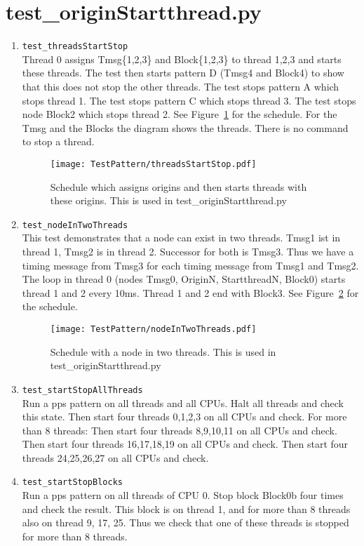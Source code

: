 \documentclass[12pt,a4paper]{report}
\begin{document}
\section{test\_originStartthread.py}
\begin{enumerate}
\item \texttt{test\_threadsStartStop} \\
Thread 0 assigns Tmsg\{1,2,3\} and Block\{1,2,3\} to thread 1,2,3 and starts these threads.
The test then starts pattern D (Tmsg4 and Block4) to show that this does not stop the other threads.
The test stops pattern A which stops thread 1.
The test stops pattern C which stops thread 3.
The test stops node Block2 which stops thread 2.
See Figure~\ref{fig:schedule_origin_startthreads} for the schedule. For the Tmsg and the Blocks the
diagram shows the threads. There is no command to stop a thread.
    \begin{figure}
        \centering
        \texttt{[image: TestPattern/threadsStartStop.pdf]}
        \caption{Schedule which assigns origins and then starts threads
        with these origins. This is used in test\_originStartthread.py}
        \label{fig:schedule_origin_startthreads}
    \end{figure}
\item \texttt{test\_nodeInTwoThreads} \\
This test demonstrates that a node can exist in two threads.
Tmsg1 ist in thread 1, Tmsg2 is in thread 2. Successor for both is Tmsg3.
Thus we have a timing message from Tmsg3 for each timing message from Tmsg1 and Tmsg2.
The loop in thread 0 (nodes Tmsg0, OriginN, StartthreadN, Block0) starts
thread 1 and 2 every 10ms. Thread 1 and 2 end with Block3.
See Figure~\ref{fig:schedule_nodeInTwoThreads} for the schedule.
    \begin{figure}
        \centering
        \texttt{[image: TestPattern/nodeInTwoThreads.pdf]}
        \caption{Schedule with a node in two threads. This is used in test\_originStartthread.py}
        \label{fig:schedule_nodeInTwoThreads}
    \end{figure}
\item \texttt{test\_startStopAllThreads} \\
    Run a pps pattern on all threads and all CPUs. Halt all threads and check this state.
    Then start four threads 0,1,2,3 on all CPUs and check.
    For more than 8 threads:
    Then start four threads 8,9,10,11 on all CPUs and check.
    Then start four threads 16,17,18,19 on all CPUs and check.
    Then start four threads 24,25,26,27 on all CPUs and check.
\item \texttt{test\_startStopBlocks} \\
    Run a pps pattern on all threads of CPU 0.
    Stop block Block0b four times and check the result. This block is on
    thread 1, and for more than 8 threads also on thread 9, 17, 25.
    Thus we check that one of these threads is stopped for more than
    8 threads.
\end{enumerate}
\end{document}
